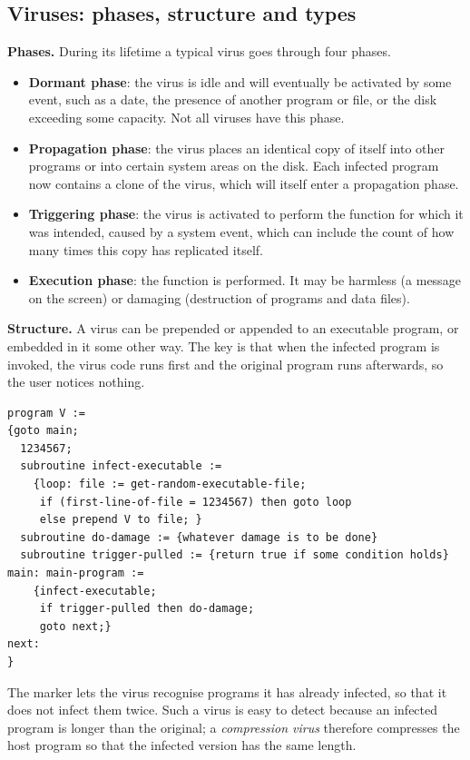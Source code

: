 \subsection{Viruses: phases, structure and types \hot\new}

\textbf{Phases.} During its lifetime a typical virus goes through four phases.
\begin{itemize}
  \item \textbf{Dormant phase}: the virus is idle and will eventually be activated by some event, such as a date, the presence of another program or file, or the disk exceeding some capacity. Not all viruses have this phase.
  \item \textbf{Propagation phase}: the virus places an identical copy of itself into other programs or into certain system areas on the disk. Each infected program now contains a clone of the virus, which will itself enter a propagation phase.
  \item \textbf{Triggering phase}: the virus is activated to perform the function for which it was intended, caused by a system event, which can include the count of how many times this copy has replicated itself.
  \item \textbf{Execution phase}: the function is performed. It may be harmless (a message on the screen) or damaging (destruction of programs and data files).
\end{itemize}

\textbf{Structure.} A virus can be prepended or appended to an executable program, or embedded in it some other way. The key is that when the infected program is invoked, the virus code runs first and the original program runs afterwards, so the user notices nothing.
\begin{keybox}[title=Structure of a simple virus (Stallings)]
\footnotesize
\begin{verbatim}
program V :=
{goto main;
  1234567;
  subroutine infect-executable :=
    {loop: file := get-random-executable-file;
     if (first-line-of-file = 1234567) then goto loop
     else prepend V to file; }
  subroutine do-damage := {whatever damage is to be done}
  subroutine trigger-pulled := {return true if some condition holds}
main: main-program :=
    {infect-executable;
     if trigger-pulled then do-damage;
     goto next;}
next:
}
\end{verbatim}
\end{keybox}
The marker  lets the virus recognise programs it has already infected, so that it does not infect them twice. Such a virus is easy to detect because an infected program is longer than the original; a \emph{compression virus} therefore compresses the host program so that the infected version has the same length.

